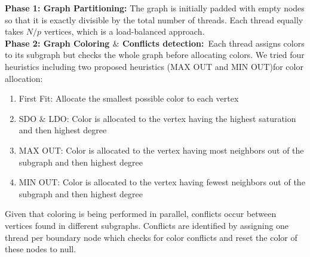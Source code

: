 \documentclass[preprint]{sigplanconf}
\begin{document}
\textbf{Phase 1: Graph Partitioning:}
The graph is initially padded with empty nodes so that it is exactly divisible by the total number of threads. Each thread equally takes $N/p$ vertices, which is a load-balanced approach.\\



\textbf{Phase 2: Graph Coloring $\&$ Conflicts detection:}\
Each thread assigns colors to its subgraph but checks the whole graph before allocating colors. We tried four heuristics including two proposed heuristics (MAX OUT and MIN OUT)for color allocation:
\renewcommand{\labelenumi}{\roman{enumi}) } 
\begin{enumerate}
  \item First Fit: Allocate the smallest possible color to each vertex
  \item SDO $\&$ LDO: Color is allocated to the vertex having the highest saturation and then highest degree
  \item MAX OUT: Color is allocated to the vertex having most neighbors out of the subgraph and then highest degree
  \item MIN OUT: Color is allocated to the vertex having fewest neighbors out of the subgraph and then highest degree
\end{enumerate}

Given that coloring is being performed in parallel, conflicts occur between vertices found in different subgraphs. Conflicts are identified by assigning one thread per boundary node which checks for color conflicts and reset the color of these nodes to null.\\

\end{document}
